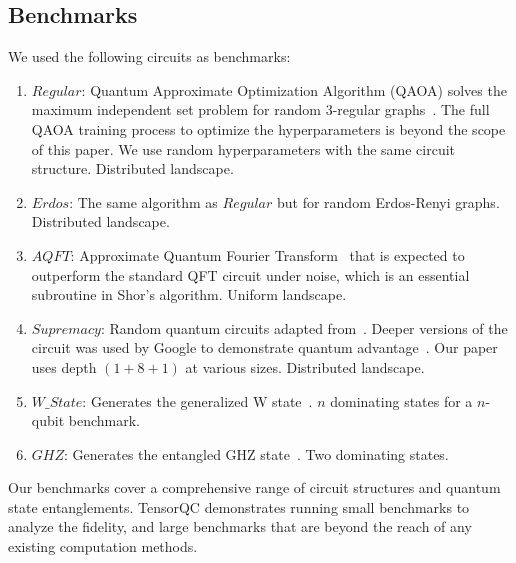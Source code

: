 \subsection{Benchmarks}\label{sec:benchmarks}
We used the following circuits as benchmarks:
\begin{enumerate}
    \item $Regular$: Quantum Approximate Optimization Algorithm (QAOA) solves the maximum independent set problem for random $3$-regular graphs~\cite{saleem2020approaches}.
    The full QAOA training process to optimize the hyperparameters is beyond the scope of this paper.
    We use random hyperparameters with the same circuit structure.
    Distributed landscape.
    \item $Erdos$: The same algorithm as $Regular$ but for random Erdos-Renyi graphs.
    Distributed landscape.
    \item $AQFT$: Approximate Quantum Fourier Transform~\cite{barenco1996approximate} that is expected to outperform the standard QFT circuit under noise,
    which is an essential subroutine in Shor's algorithm.
    Uniform landscape.
    \item $Supremacy$: Random quantum circuits adapted from~\cite{boixo2018characterizing}.
    Deeper versions of the circuit was used by Google to demonstrate quantum advantage~\cite{arute2019quantum}.
    Our paper uses depth $(1+8+1)$ at various sizes.
    Distributed landscape.
    \item $W\_State$: Generates the generalized W state~\cite{dur2000three, diker2016deterministic}.
    $n$ dominating states for a $n$-qubit benchmark.
    \item $GHZ$: Generates the entangled GHZ state~\cite{greenberger1989going}.
    Two dominating states.
\end{enumerate}
Our benchmarks cover a comprehensive range of circuit structures and quantum state entanglements.
TensorQC demonstrates running small benchmarks to analyze the fidelity,
and large benchmarks that are beyond the reach of any existing computation methods.